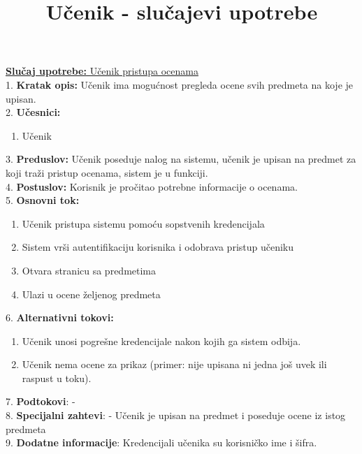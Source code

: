 \documentclass{article}
\title{Učenik - slučajevi upotrebe}
\begin{document}
\maketitle

\underline{\textbf{Slučaj upotrebe:} Učenik pristupa ocenama} \\

1. \textbf{Kratak opis:}  Učenik ima mogućnost pregleda ocene svih predmeta na koje je upisan.\\

2. \textbf{Učesnici:}
\begin{enumerate} [label=(\alph*)]
\item Učenik
\end{enumerate} 

3. \textbf{Preduslov:} Učenik poseduje nalog na sistemu, učenik je upisan na predmet za koji traži pristup ocenama, sistem je u funkciji. \\

4. \textbf{Postuslov:} Korisnik je pročitao potrebne informacije o ocenama.\\

5. \textbf{Osnovni tok:} 
\begin{enumerate} [label=(\alph*)]
\item Učenik pristupa sistemu pomoću sopstvenih kredencijala
\item Sistem vrši autentifikaciju korisnika i odobrava pristup učeniku
\item Otvara stranicu sa predmetima
\item Ulazi u ocene željenog predmeta
\end{enumerate}

6. \textbf{Alternativni tokovi:}
\begin{enumerate} [label=(\roman*)]
\item Učenik unosi pogrešne kredencijale nakon kojih ga sistem odbija.
\item Učenik nema ocene za prikaz (primer: nije upisana ni jedna još uvek ili raspust u toku).
\end{enumerate}

7. \textbf{Podtokovi}: - \\

8. \textbf{Specijalni zahtevi}: - Učenik je upisan na predmet i poseduje ocene iz istog predmeta\\

9. \textbf{Dodatne informacije}: Kredencijali učenika su korisničko ime i šifra.\\
\end{document}
